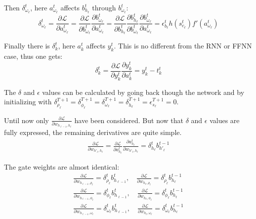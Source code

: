 Then $\delta_{\omega_\ell}^t$, here $a_{\omega_\ell}^t$ affects $b_{h_\ell}^t$ through $b_{\omega_\ell}^t$:
\begin{equation}
\delta_{\omega_\ell}^t
= \frac{\partial \mathcal{L}}{\partial a_{\omega_\ell}^t}
= \frac{\partial \mathcal{L}}{\partial b_{\omega_\ell}^t} \frac{\partial b_{\omega_\ell}^t}{\partial a_{\omega_\ell}^t}
= \frac{\partial \mathcal{L}}{\partial b_{h_\ell}^t} \frac{\partial b_{h_\ell}^t}{\partial b_{\omega_\ell}^t} \frac{\partial b_{\omega_\ell}^t}{\partial a_{\omega_\ell}^t}
= \epsilon_{b_\ell}^t h(s_{c_\ell}^t) f'(a_{\omega_\ell}^t)
\end{equation}

Finally there is $\delta_k^t$, here $a_k^t$ affects $y_k^t$. This is no different from the RNN or FFNN case, thus one gets:
\begin{equation}
\delta_k^t = \frac{\partial \mathcal{L}}{\partial y_k^t} \frac{\partial y_k^t}{\partial a_k^t} = y_k^t - t_k^t
\end{equation}

The $\delta$ and $\epsilon$ values can be calculated by going back though the network and by initializing with $\delta_{\rho_\ell}^{T+1} = \delta_{\phi_\ell}^{T+1} = \delta_{\omega_\ell}^{T+1} = \delta_{h_\ell}^{T+1} = \epsilon_{s_\ell}^{T+1} = 0$. 

Until now only $\frac{\partial \mathcal{L}}{\partial w_{h_{\ell-1}, h_\ell}}$ have been considered. But now that $\delta$ and $\epsilon$ values are fully expressed, the remaining derivatives are quite simple.
\begin{align}
\frac{\partial \mathcal{L}}{\partial w_{h'_\ell, h_\ell}}
= \frac{\partial \mathcal{L}}{\partial a_{h_\ell}^t} \frac{\partial a_{h_\ell}^t}{\partial w_{h'_\ell, h_\ell}}
= \delta_{h_\ell}^t b_{h'_\ell}^{t-1}
\end{align}

The gate weights are almost identical:
\begin{align}
\frac{\partial \mathcal{L}}{\partial w_{h_{\ell-1}, \rho_\ell}}
= \delta_{\rho_\ell}^t b_{h_{\ell-1}}^t, \quad
\frac{\partial \mathcal{L}}{\partial w_{h_\ell, \rho_\ell}}
= \delta_{\rho_\ell}^t b_{h_\ell}^{t-1} \\
\frac{\partial \mathcal{L}}{\partial w_{h_{\ell-1}, \phi_\ell}}
= \delta_{\phi_\ell}^t b_{h_{\ell-1}}^t, \quad
\frac{\partial \mathcal{L}}{\partial w_{h_\ell, \phi_\ell}}
= \delta_{\phi_\ell}^t b_{h_\ell}^{t-1} \\
\frac{\partial \mathcal{L}}{\partial w_{h_{\ell-1}, \omega_\ell}}
= \delta_{\omega_\ell}^t b_{h_{\ell-1}}^t, \quad
\frac{\partial \mathcal{L}}{\partial w_{h_\ell, \omega_\ell}}
= \delta_{\omega_\ell}^t b_{h_\ell}^{t-1}
\end{align}
